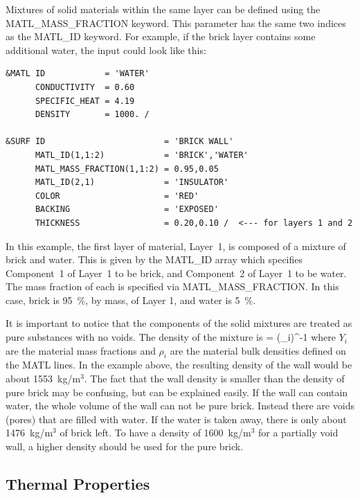 \documentclass[11pt]{book}
\begin{document}
Mixtures of solid materials within the same layer can be defined using the {\ct MATL\_MASS\_FRACTION} keyword. This parameter has the same two indices as the {\ct MATL\_ID} keyword. For example, if the brick layer contains some additional water, the input could look like this:
\begin{lstlisting}
&MATL ID            = 'WATER'
      CONDUCTIVITY  = 0.60
      SPECIFIC_HEAT = 4.19
      DENSITY       = 1000. /

&SURF ID                        = 'BRICK WALL'
      MATL_ID(1,1:2)            = 'BRICK','WATER'
      MATL_MASS_FRACTION(1,1:2) = 0.95,0.05
      MATL_ID(2,1)              = 'INSULATOR'
      COLOR                     = 'RED'
      BACKING                   = 'EXPOSED'
      THICKNESS                 = 0.20,0.10 /  <--- for layers 1 and 2
\end{lstlisting}
In this example, the first layer of material, Layer~1, is composed of a mixture of brick and water. This is given by the {\ct MATL\_ID} array which specifies Component~1 of Layer~1 to be brick, and Component~2 of Layer~1 to be water. The mass fraction of each is specified via {\ct MATL\_MASS\_FRACTION}. In this case, brick is 95~\%, by mass, of Layer 1, and water is 5~\%.

It is important to notice that the components of the solid mixtures are treated as pure substances with no voids. The density of the mixture is
\be
\rho = \left(\sum_i\right)^{-1}
\ee
where $Y_i$ are the material mass fractions and $\rho_i$ are the material bulk densities defined on the {\ct MATL} lines. In the example above, the resulting density of the wall would be about 1553~kg/m$^3$. The fact that the wall density is smaller than the density of pure brick may be confusing, but can be explained easily. If the wall can contain water, the whole volume of the wall can not be pure brick. Instead there are voids (pores) that are filled with water. If the water is taken away, there is only about 1476~kg/m$^3$ of brick left. To have a density of 1600~kg/m$^3$ for a partially void wall, a higher density should be used for the pure brick.

\subsection{Thermal Properties}

\label{info:thermal_properties}
\end{document}
